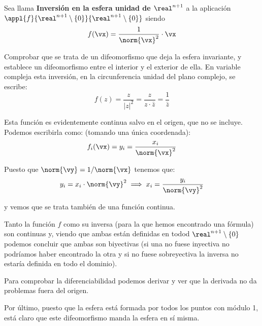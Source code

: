 \begin{problem}[10]
Sea llama \textbf{Inversión en la esfera unidad de $\real^{n+1}$} a la aplicación $\appl{f}{\real^{n+1}\setminus \{0\}}{\real^{n+1}\setminus \{0\}}$ siendo
\[f(\vx)=\frac{1}{\norm{\vx}^2} \cdot \vx\]

Comprobar que se trata de un difeomorfismo que deja la esfera invariante, y establece un difeomorfismo entre el interior y el exterior de ella. En variable compleja esta inversión, en la circunferencia unidad del plano complejo, se escribe:
\[f(z)=\frac{z}{|z|^2}=\frac{z}{z\cdot \bar{z}} = \frac{1}{\bar{z}}\]

\solution
{}

Esta función es evidentemente continua salvo en el origen, que no se incluye. Podemos escribirla como: (tomando una única coordenada):
\[f_i(\vx)=y_i=\frac{x_i}{\norm{\vx}^2}\]

Puesto que $\norm{\vy}=1/\norm{\vx}$ tenemos que:
\[y_i = x_i \cdot \norm{\vy}^2 \implies x_i = \frac{y_i}{\norm{\vy}^2}\]

y vemos que se trata también de una función continua.

Tanto la función $f$ como su inversa (para la que hemos encontrado una fórmula) son continuas y, viendo que ambas están definidas en todod $\real^{n+1}\setminus \{0\}$ podemos concluir que ambas son biyectivas (si una no fuese inyectiva no podríamos haber encontrado la otra y si no fuese sobreyectiva la inversa no estaría definida en todo el dominio).

Para comprobar la diferenciabilidad podemos derivar y ver que la derivada no da problemas fuera del origen.

Por último, puesto que la esfera está formada por todos los puntos con módulo 1, está claro que este difeomorfismo manda la esfera en sí misma.

\end{problem}

